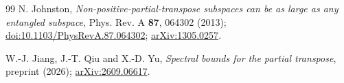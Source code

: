 \documentclass[11pt,a4paper]{article}
\theoremstyle{definition}
\theoremstyle{plain}
\begin{document}
\begin{thebibliography}{99}
N. Johnston,
\emph{Non-positive-partial-transpose subspaces can be as large as any
entangled subspace},
Phys. Rev. A \textbf{87}, 064302 (2013);
\href{https://doi.org/10.1103/PhysRevA.87.064302}{doi:10.1103/PhysRevA.87.064302};
\href{https://arxiv.org/abs/1305.0257}{arXiv:1305.0257}.

W.-J. Jiang, J.-T. Qiu and X.-D. Yu,
\emph{Spectral bounds for the partial transpose},
preprint (2026);
\href{https://arxiv.org/abs/2609.06617}{arXiv:2609.06617}.
\end{thebibliography}
\endgroup
\end{document}
